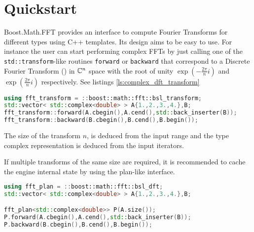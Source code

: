 \section{Quickstart}

Boost.Math.FFT provides an interface to compute Fourier Transforms for different
types using C++ templates.
Its design aims to be easy to use.
For instance the user can start performing 
complex FFTs by just calling one of the \texttt{std::transform}-like routines
\texttt{forward} or \texttt{backward} that correspond to a Discrete Fourier
Transform (\dft) in $\mathbb{C}^n$ space with the root of unity
$\exp(-\frac{2\pi}{n} i)$ and $\exp(\frac{2\pi}{n} i)$ respectively.
See listings \ref{ls:complex_dft_transform}
\begin{lstlisting}[language=C++,label=ls:complex_dft_transform,caption=Simple complex FFT
transform.]
using fft_transform = ::boost::math::fft::bsl_transform;
std::vector< std::complex<double> > A{1.,2.,3.,4.},B;
fft_transform::forward(A.cbegin(),A.cend(),std::back_inserter(B));
fft_transform::backward(B.cbegin(),B.cend(),B.begin());
\end{lstlisting}
The size of the transform $n$, is deduced from the input range and the type
complex representation is deduced from the input iterators.

If multiple transforms of the same size are required, it is recommended to cache
the engine internal state by using the plan-like interface.
\begin{lstlisting}[language=C++,label=ls:complex_dft_plan,caption=Simple complex FFT
Plan.]
using fft_plan = ::boost::math::fft::bsl_dft;
std::vector< std::complex<double> > A{1.,2.,3.,4.},B;

fft_plan<std::complex<double>> P(A.size());
P.forward(A.cbegin(),A.cend(),std::back_inserter(B));
P.backward(B.cbegin(),B.cend(),B.begin());
\end{lstlisting}
